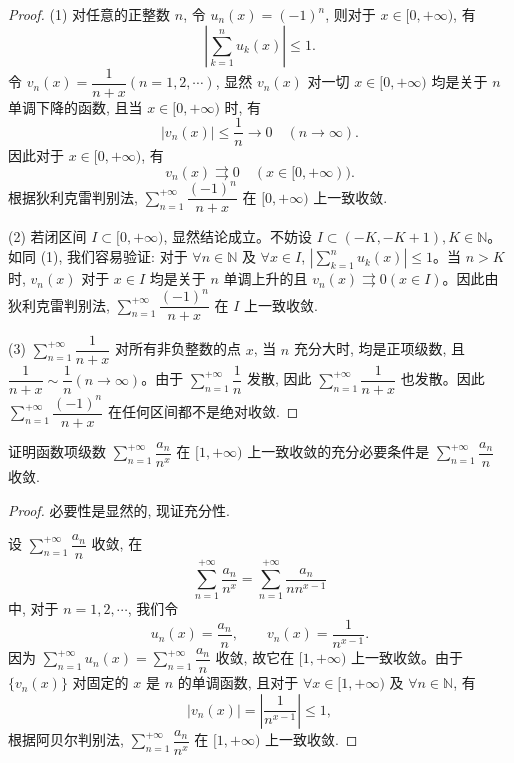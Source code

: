 \begin{proof}
(1) 对任意的正整数 $n$, 令 $u_n(x)=(-1)^n$, 则对于 $x\in[0,+\infty)$, 有
\[
  \left|\sum_{k=1}^n u_k(x)\right|\leq1.
\]
令 $v_n(x)=\dfrac1{n+x}(n=1,2,\cdots)$, 显然 $v_n(x)$ 对一切 $x\in[0,+\infty)$ 均是关于 $n$ 单调下降的函数, 且当 $x\in[0,+\infty)$ 时, 有
\[
  |v_n(x)|\leq\frac1n\to0\quad(n\to\infty).
\]
因此对于 $x\in[0,+\infty)$, 有
\[
  v_n(x)\rightrightarrows0\quad(x\in[0,+\infty)).
\]
根据狄利克雷判别法, $\sum\limits_{n=1}^{+\infty}\dfrac{(-1)^n}{n+x}$ 在 $[0,+\infty)$ 上一致收敛.

(2) 若闭区间 $I\subset[0,+\infty)$, 显然结论成立。不妨设 $I\subset(-K,-K+1), K\in\mathbb N$。如同 (1), 我们容易验证: 对于 $\forall n\in\mathbb N$ 及 $\forall x\in I$, $\left|\sum\limits_{k=1}^n u_k(x)\right|\leq1$。当 $n>K$ 时, $v_n(x)$ 对于 $x\in I$ 均是关于 $n$ 单调上升的且 $v_n(x)\rightrightarrows0(x\in I)$。因此由狄利克雷判别法, $\sum\limits_{n=1}^{+\infty}\dfrac{(-1)^n}{n+x}$ 在 $I$ 上一致收敛.

(3) $\sum\limits_{n=1}^{+\infty}\dfrac1{n+x}$ 对所有非负整数的点 $x$, 当 $n$ 充分大时, 均是正项级数, 且 $\dfrac1{n+x}\sim\dfrac1n(n\to\infty)$。由于 $\sum\limits_{n=1}^{+\infty}\dfrac1n$ 发散, 因此 $\sum\limits_{n=1}^{+\infty}\dfrac1{n+x}$ 也发散。因此 $\sum\limits_{n=1}^{+\infty}\dfrac{(-1)^n}{n+x}$ 在任何区间都不是绝对收敛.
\end{proof}


\begin{example}\label{example:ma-10-3-7}
证明函数项级数 $\sum\limits_{n=1}^{+\infty}\dfrac{a_n}{n^x}$ 在 $[1,+\infty)$ 上一致收敛的充分必要条件是 $\sum\limits_{n=1}^{+\infty}\dfrac{a_n}{n}$ 收敛.
\end{example}


\begin{proof}
必要性是显然的, 现证充分性.

设 $\sum\limits_{n=1}^{+\infty}\dfrac{a_n}{n}$ 收敛, 在
\[
  \sum_{n=1}^{+\infty}\frac{a_n}{n^x}
  =\sum_{n=1}^{+\infty}\frac{a_n}{nn^{x-1}}
\]
中, 对于 $n=1,2,\cdots$, 我们令
\[
  u_n(x)=\frac{a_n}{n},\qquad v_n(x)=\frac1{n^{x-1}}.
\]
因为 $\sum\limits_{n=1}^{+\infty}u_n(x)=\sum\limits_{n=1}^{+\infty}\dfrac{a_n}{n}$ 收敛, 故它在 $[1,+\infty)$ 上一致收敛。由于 $\{v_n(x)\}$ 对固定的 $x$ 是 $n$ 的单调函数, 且对于 $\forall x\in[1,+\infty)$ 及 $\forall n\in\mathbb N$, 有
\[
  |v_n(x)|=\left|\frac1{n^{x-1}}\right|\leq1,
\]
根据阿贝尔判别法, $\sum\limits_{n=1}^{+\infty}\dfrac{a_n}{n^x}$ 在 $[1,+\infty)$ 上一致收敛.
\end{proof}


